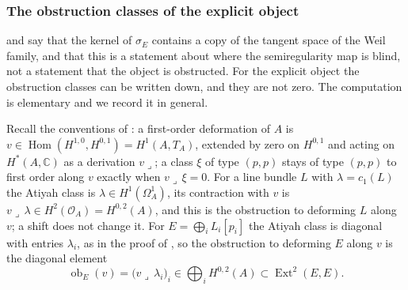 \documentclass[11pt,reqno]{amsart}
\theoremstyle{plain}
\theoremstyle{definition}
\theoremstyle{remark}
\newcommand{\CC}{\mathbb{C}}
\newcommand{\cO}{\mathcal{O}}
\DeclareMathOperator{\Hom}{Hom}
\DeclareMathOperator{\Ext}{Ext}
\DeclareMathOperator{\ob}{ob}
\begin{document}
\subsubsection*{The obstruction classes of the explicit object}

\cite[Corollary~9.18]{paperI} and \cite[Remark~9.21]{paperI} say that the kernel of
$\sigma_{E}$ contains a copy of the tangent space of the Weil family, and
that this is a statement about where the semiregularity map is blind, not a
statement that the object is obstructed. For the explicit object the
obstruction classes can be written down, and they are not zero. The
computation is elementary and we record it in general.

Recall the conventions of \cite[Section~9.3]{paperI}: a first-order deformation of
$A$ is $v\in\Hom(H^{1,0},H^{0,1})=H^{1}(A,T_{A})$, extended by zero on
$H^{0,1}$ and acting on $H^{*}(A,\CC)$ as a derivation $v\lrcorner$; a class
$\xi$ of type $(p,p)$ stays of type $(p,p)$ to first order along $v$ exactly
when $v\lrcorner\,\xi=0$. For a line bundle $L$ with $\lambda=c_{1}(L)$ the
Atiyah class is $\lambda\in H^{1}(\Omega^{1}_{A})$, its contraction with $v$
is $v\lrcorner\,\lambda\in H^{2}(\cO_{A})=H^{0,2}(A)$, and this is the
obstruction to deforming $L$ along $v$; a shift does not change it. For
$E=\bigoplus_{i}L_{i}[p_{i}]$ the Atiyah class is diagonal with entries
$\lambda_{i}$, as in the proof of , so the
obstruction to deforming $E$ along $v$ is the diagonal element
\begin{equation}\label{eq:obdef}
  \ob_{E}(v)=\bigl(v\lrcorner\,\lambda_{i}\bigr)_{i}
  \in\bigoplus_{i}H^{0,2}(A)\subset\Ext^{2}(E,E).
\end{equation}
\end{document}
